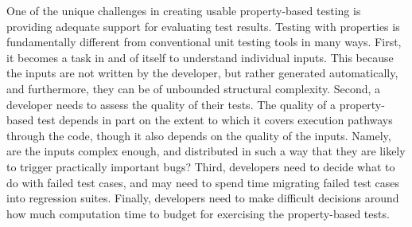 



One of the unique challenges in creating usable property-based testing is
providing adequate support for evaluating test results. Testing with properties
is fundamentally different from conventional unit testing tools in many ways.
First, it becomes a task in and of itself to understand individual inputs. This
because the inputs are not written by the developer, but rather generated
automatically, and furthermore, they can be of unbounded structural complexity.
Second, a developer needs to assess the quality of their tests. The quality of a
property-based test depends in part on the extent to which it covers execution
pathways through the code, though it also depends on the quality of the inputs.
Namely, are the inputs complex enough, and distributed in such a way that they
are likely to trigger practically important bugs? Third, developers need to
decide what to do with failed test cases, and may need to spend time migrating
failed test cases into regression suites. Finally, developers need to make
difficult decisions around how much computation time to budget for exercising
the property-based tests.

